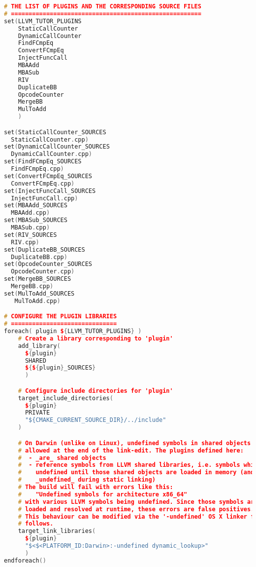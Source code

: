 \documentclass[16pt]{article}
\begin{document}
\vspace{2.5pt}
\begin{lstlisting}[caption=Updated CMakeLists.txt file located under llvm-tutor/lib, label=update-CMakeLists.txt-under-llvm-tutor/lib,
style=chstyle,language=C++]
# THE LIST OF PLUGINS AND THE CORRESPONDING SOURCE FILES
# ======================================================
set(LLVM_TUTOR_PLUGINS
    StaticCallCounter
    DynamicCallCounter
    FindFCmpEq
    ConvertFCmpEq
    InjectFuncCall
    MBAAdd
    MBASub
    RIV
    DuplicateBB
    OpcodeCounter
    MergeBB
    MulToAdd
    )

set(StaticCallCounter_SOURCES
  StaticCallCounter.cpp)
set(DynamicCallCounter_SOURCES
  DynamicCallCounter.cpp)
set(FindFCmpEq_SOURCES
  FindFCmpEq.cpp)
set(ConvertFCmpEq_SOURCES
  ConvertFCmpEq.cpp)
set(InjectFuncCall_SOURCES
  InjectFuncCall.cpp)
set(MBAAdd_SOURCES
  MBAAdd.cpp)
set(MBASub_SOURCES
  MBASub.cpp)
set(RIV_SOURCES
  RIV.cpp)
set(DuplicateBB_SOURCES
  DuplicateBB.cpp)
set(OpcodeCounter_SOURCES
  OpcodeCounter.cpp)
set(MergeBB_SOURCES
  MergeBB.cpp)
set(MulToAdd_SOURCES  
   MulToAdd.cpp)

# CONFIGURE THE PLUGIN LIBRARIES
# ==============================
foreach( plugin ${LLVM_TUTOR_PLUGINS} )
    # Create a library corresponding to 'plugin'
    add_library(
      ${plugin}
      SHARED
      ${${plugin}_SOURCES}
      )

    # Configure include directories for 'plugin'
    target_include_directories(
      ${plugin}
      PRIVATE
      "${CMAKE_CURRENT_SOURCE_DIR}/../include"
    )

    # On Darwin (unlike on Linux), undefined symbols in shared objects are not
    # allowed at the end of the link-edit. The plugins defined here:
    #  - _are_ shared objects
    #  - reference symbols from LLVM shared libraries, i.e. symbols which are
    #    undefined until those shared objects are loaded in memory (and hence
    #    _undefined_ during static linking)
    # The build will fail with errors like this:
    #    "Undefined symbols for architecture x86_64"
    # with various LLVM symbols being undefined. Since those symbols are later
    # loaded and resolved at runtime, these errors are false positives.
    # This behaviour can be modified via the '-undefined' OS X linker flag as
    # follows.
    target_link_libraries(
      ${plugin}
      "$<$<PLATFORM_ID:Darwin>:-undefined dynamic_lookup>"
      )
endforeach()
\end{lstlisting}
\end{document}
